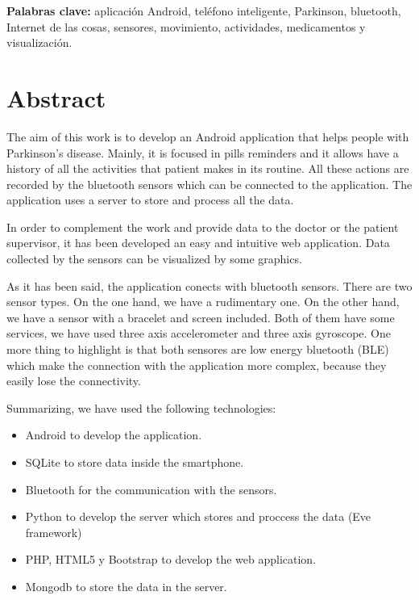 \documentclass[11pt,spanish]{article}
\begin{document}
{\bf Palabras clave:} aplicación Android, teléfono inteligente, Parkinson, bluetooth, Internet de las cosas, sensores, movimiento, actividades, medicamentos y visualización.
\newpage

\section*{Abstract}
The aim of this work is to develop an Android application that helps people with Parkinson's disease. Mainly, it is focused in pills reminders and it allows have a history of all the activities that patient makes in its routine. All these actions are recorded by the bluetooth sensors which can be connected to the application. The application uses a server to store and process all the data.
\newline

In order to complement the work and provide data to the doctor or the patient supervisor, it has been developed an easy and intuitive web application. Data collected by the sensors can be visualized by some graphics.
\newline

As it has been said, the application conects with bluetooth sensors. There are two sensor types. On the one hand, we have a rudimentary one. On the other hand, we have a sensor with a bracelet and screen included. Both of them have some services, we have used three axis accelerometer and three axis gyroscope. One more thing to highlight is that both sensores are low energy bluetooth (BLE) which make the connection with the application more complex, because they easily lose the connectivity.
\newline

Summarizing, we have used the following technologies:

\begin{itemize}
    \item Android to develop the application. 
	\item SQLite to store data inside the smartphone. 
	\item Bluetooth for the communication with the sensors. 
	\item Python to develop the server which stores and proccess the data (Eve framework)
    \item PHP, HTML5 y Bootstrap to develop the web application.
	\item Mongodb to store the data in the server.
    \newline
\end{itemize}
\newpage
\end{document}
